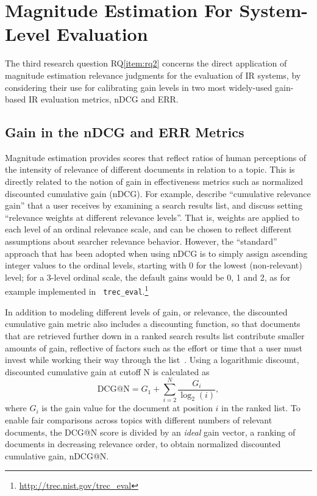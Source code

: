 
\section{Magnitude Estimation For System-Level Evaluation}
\label{sec:rq2}

The third research question RQ\ref{item:rq2} concerns the direct
application of magnitude estimation relevance judgments for the
evaluation of IR systems, by considering their use for calibrating
gain levels in two most widely-used gain-based IR evaluation metrics, nDCG
and ERR.


\subsection{Gain in the nDCG and ERR Metrics}
\label{sec:ndcg-err}

Magnitude estimation provides scores
that reflect ratios of human perceptions of the intensity 
of relevance of
different documents in relation to a topic.
This is directly related to the notion of gain in effectiveness metrics
such as normalized discounted cumulative gain (nDCG).
For example, 
\citet{JarKek02} describe ``cumulative relevance gain'' that a user
receives by examining a search results list, and discuss setting
``relevance weights at different relevance levels''.
That is, weights are applied to each level of an ordinal relevance scale,
and can be chosen to reflect different assumptions about searcher
relevance behavior.
However, the ``standard'' approach that has been adopted when using nDCG
is to simply assign ascending integer values to the ordinal levels,
starting with 0 for the lowest (non-relevant) level; for a 3-level
ordinal scale, the default gains would be 0, 1 and 2, as for example
implemented in {\tt
trec\_eval}.\footnote{\url{http://trec.nist.gov/trec_eval}}

In addition to modeling different levels of gain, or relevance,
the discounted cumulative gain metric also includes a discounting
function, 
so that documents that are retrieved further down in a ranked search
results list contribute smaller amounts of gain, reflective of 
factors such as the effort or time that a user must invest while working
their way through the list~\cite{JarKek02}.
Using a logarithmic discount, discounted cumulative gain
at cutoff N is calculated as 
\[
\mathrm{DCG@N} = G_1 + \sum^{N}_{i=2} \frac{G_i}{\log_2(i)},
\]
\noindent where $G_i$ is the gain value for the document at position $i$
in the ranked list. To enable fair comparisons
across topics with different numbers of relevant documents, the DCG@N
score is divided by an \emph{ideal} gain vector, a
ranking of documents in decreasing relevance order, to obtain normalized
discounted cumulative gain, nDCG@N.

